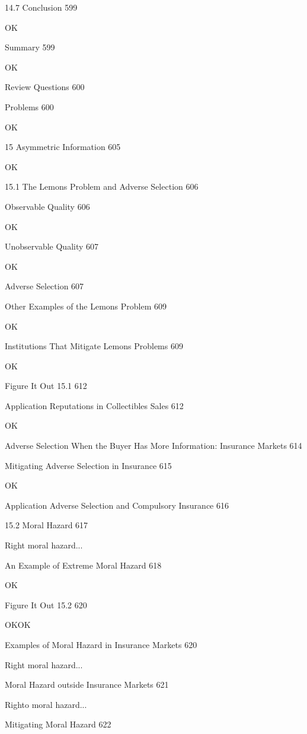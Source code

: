 14.7 Conclusion 599

OK

Summary 599

OK

Review Questions 600



Problems 600

OK

15 Asymmetric Information 605

OK

15.1 The Lemons Problem and Adverse Selection 606



Observable Quality 606

OK

Unobservable Quality 607

OK

Adverse Selection 607



Other Examples of the Lemons Problem 609

OK

Institutions That Mitigate Lemons Problems 609

OK

Figure It Out 15.1 612



Application Reputations in Collectibles Sales 612

OK

Adverse Selection When the Buyer Has More Information: Insurance Markets 614



Mitigating Adverse Selection in Insurance 615

OK

Application Adverse Selection and Compulsory Insurance 616



15.2 Moral Hazard 617

Right moral hazard...

An Example of Extreme Moral Hazard 618

OK

Figure It Out 15.2 620

OKOK

Examples of Moral Hazard in Insurance Markets 620

Right moral hazard...

Moral Hazard outside Insurance Markets 621

Righto moral hazard...

Mitigating Moral Hazard 622

